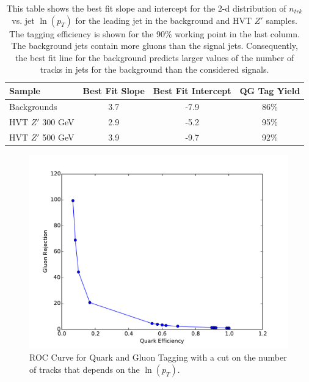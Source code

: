 \begin{table}
\begin{tabular}{|l|c|c|c|}
\hline
Sample & Best Fit Slope & Best Fit Intercept & QG Tag Yield \\\hline
Backgrounds & 3.7 & -7.9 & 86\% \\\hline
HVT $Z'$ 300 GeV &  2.9 & -5.2 & 95\% \\\hline
HVT $Z'$ 500 GeV & 3.9 & -9.7 & 92\% \\\hline
\end{tabular}
\caption{This table shows the best fit slope and intercept for the 2-d distribution of $n_{trk}$ vs. jet $\ln(p_{T})$ for the leading jet in the background and HVT $Z'$ samples. The tagging efficiency is shown for the 90\% working point in the last column. The background jets contain more gluons than the signal jets. Consequently, the best fit line for the background predicts larger values of the number of tracks in jets for the background than the considered signals.}
\label{tbl:qgtable}
\end{table}

\begin{figure}[h!]
  \centering
  \includegraphics[width=\hsize]{figures/QGT/finalroc.pdf}
  \caption{ROC Curve for Quark and Gluon Tagging with a cut on the number of tracks that depends on the $\ln(p_{T})$.}
  \label{fig:quark_gluon_roc}
\end{figure}
\FloatBarrier


